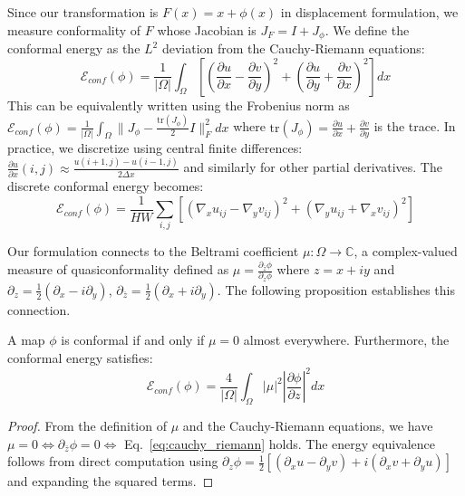 Since our transformation is $F(x) = x + \phi(x)$ in displacement formulation, we measure conformality of $F$ whose Jacobian is $J_F = I + J_\phi$. We define the conformal energy as the $L^2$ deviation from the Cauchy-Riemann equations:
\begin{equation}
\mathcal{E}_{conf}(\phi) = \frac{1}{|\Omega|} \int_\Omega \left[ \left( \frac{\partial u}{\partial x} - \frac{\partial v}{\partial y} \right)^2 + \left( \frac{\partial u}{\partial y} + \frac{\partial v}{\partial x} \right)^2 \right] dx
\label{eq:conformal_energy}
\end{equation}
This can be equivalently written using the Frobenius norm as $\mathcal{E}_{conf}(\phi) = \frac{1}{|\Omega|} \int_\Omega \| J_\phi - \frac{\text{tr}(J_\phi)}{2} I \|_F^2 dx$ where $\text{tr}(J_\phi) = \frac{\partial u}{\partial x} + \frac{\partial v}{\partial y}$ is the trace. In practice, we discretize using central finite differences: $\frac{\partial u}{\partial x}(i,j) \approx \frac{u(i+1,j) - u(i-1,j)}{2\Delta x}$ and similarly for other partial derivatives. The discrete conformal energy becomes:
\begin{equation}
\mathcal{E}_{conf}(\phi) = \frac{1}{HW} \sum_{i,j} \left[ \left( \nabla_x u_{ij} - \nabla_y v_{ij} \right)^2 + \left( \nabla_y u_{ij} + \nabla_x v_{ij} \right)^2 \right]
\label{eq:discrete_conformal}
\end{equation}

Our formulation connects to the Beltrami coefficient $\mu: \Omega \rightarrow \mathbb{C}$, a complex-valued measure of quasiconformality defined as $\mu = \frac{\partial_{\bar{z}} \phi}{\partial_z \phi}$ where $z = x + iy$ and $\partial_z = \frac{1}{2}(\partial_x - i\partial_y)$, $\partial_{\bar{z}} = \frac{1}{2}(\partial_x + i\partial_y)$. The following proposition establishes this connection.

\begin{proposition}
\label{prop:beltrami}
A map $\phi$ is conformal if and only if $\mu = 0$ almost everywhere. Furthermore, the conformal energy satisfies:
\begin{equation}
\mathcal{E}_{conf}(\phi) = \frac{4}{|\Omega|} \int_\Omega |\mu|^2 \left| \frac{\partial \phi}{\partial z} \right|^2 dx
\end{equation}
\end{proposition}

\begin{proof}
From the definition of $\mu$ and the Cauchy-Riemann equations, we have $\mu = 0 \Leftrightarrow \partial_{\bar{z}} \phi = 0 \Leftrightarrow$ Eq.~\eqref{eq:cauchy_riemann} holds. The energy equivalence follows from direct computation using $\partial_z \phi = \frac{1}{2}[(\partial_x u - \partial_y v) + i(\partial_x v + \partial_y u)]$ and expanding the squared terms.
\end{proof}

